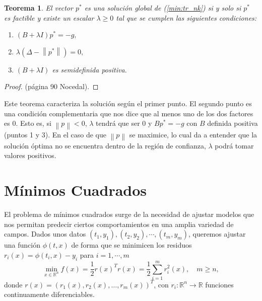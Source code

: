 \documentclass[11pt,a4paper]{book}
\newtheorem{theorem}{Teorema}[chapter]
\theoremstyle{definition}
\theoremstyle{remark}
\newcommand{\norm}[1]{\left\lVert#1\right\rVert}
\begin{document}
\begin{theorem} \label{th:trustregion}
	El vector $p^*$ es una solución global de (\ref{min:tr_nk}) si y solo si $p^*$ es factible y existe un escalar $\lambda \geq 0$ tal que se cumplen las siguientes condiciones:
\begin{enumerate}
	\item $(B+\lambda I)p^*=-g,$
	\item $\lambda (\Delta - \norm{p^*}) = 0,$
	\item $(B+\lambda I)$ es semidefinida positiva.
\end{enumerate}
\end{theorem}
\begin{proof}
(página 90 Nocedal).
\end{proof}

Este teorema caracteriza la solución según el primer punto. El segundo punto es una condición complementaria que nos dice que al menos uno de los dos factores es 0.
Esto es, si $\norm{p}<0$, $\lambda$ tendrá que ser 0 y $Bp^*=-g$ con $B$ definida positiva (puntos 1 y 3).
En el caso de que $\norm{p}$ se maximice, lo cual da a entender que la solución óptima no se encuentra dentro de la región de confianza, $\lambda$ podrá tomar valores positivos.

\chapter{Mínimos Cuadrados}

El problema de mínimos cuadrados surge de la necesidad de ajustar modelos que nos permitan predecir ciertos comportamientos en una amplia variedad de campos. Dados unos datos $(t_1,y_1),(t_2,y_2),\cdots,(t_m,y_m)$, queremos ajustar una función
$\phi(t,x)$ de forma que se minimicen los residuos $r_i(x) = \phi(t_i,x) - y_i$ para $i=1,\cdots,m$
\begin{equation}
	\min_{x\in \mathbb{R}^{n}}f(x) = \frac{1}{2} r(x)^Tr(x) = \frac{1}{2}\sum_{i=1}^{m}r_i^2(x), \quad m\geq n,
	\label{eq:lsp}
\end{equation}
donde $r(x) = (r_1(x), r_2(x), \ldots, r_m(x))^T$, con $r_i : \mathbb{R}^{n} \rightarrow \mathbb{R}$ funciones continuamente diferenciables. 

\end{document}
